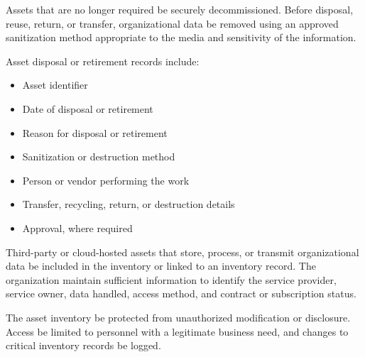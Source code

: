 Assets that are no longer required \must{} be securely decommissioned. Before disposal, reuse, return, or transfer, organizational data \must{} be removed using an approved sanitization method appropriate to the media and sensitivity of the information.

Asset disposal or retirement records \should{} include:
\begin{itemize}
    \item Asset identifier
    \item Date of disposal or retirement
    \item Reason for disposal or retirement
    \item Sanitization or destruction method
    \item Person or vendor performing the work
    \item Transfer, recycling, return, or destruction details
    \item Approval, where required
\end{itemize}

Third-party or cloud-hosted assets that store, process, or transmit organizational data \must{} be included in the inventory or linked to an inventory record. The organization \must{} maintain sufficient information to identify the service provider, service owner, data handled, access method, and contract or subscription status.

The asset inventory \should{} be protected from unauthorized modification or disclosure. Access \must{} be limited to personnel with a legitimate business need, and changes to critical inventory records \should{} be logged.